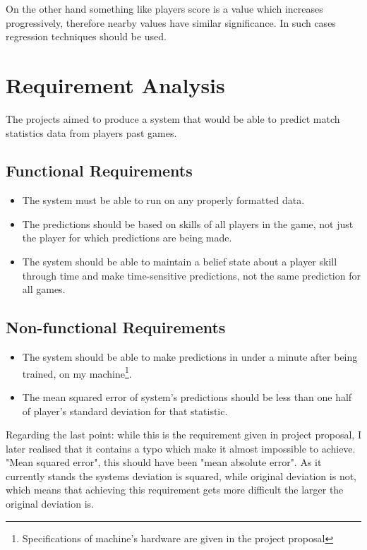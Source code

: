\documentclass[12pt,a4paper]{book}
\begin{document}
On the other hand something like players score is a value which increases progressively, therefore nearby values have similar significance.
In such cases regression techniques should be used.
\section{Requirement Analysis}
The projects aimed to produce a system that would be able to predict match statistics data from players past games.
\subsection{Functional Requirements}
\begin{itemize}
\item The system must be able to run on any properly formatted data.
\item The predictions should be based on skills of all players in the game, not just the player for which predictions are being made.
\item The system should be able to maintain a belief state about a player skill through time and make time-sensitive predictions, not the same prediction for all games. %
\end{itemize}
\subsection{Non-functional Requirements}
\begin{itemize}
\item The system should be able to make predictions in under a minute after being trained, on my machine\footnote{Specifications of machine's hardware are given in the project proposal}.
\item The mean squared error of system's predictions should be less than one half of player's standard deviation for that statistic.
\end{itemize}
Regarding the last point: while this is the requirement given in project proposal, I later realised that it contains a typo which make it almost impossible to achieve.
"Mean squared error", this should have been "mean absolute error".
As it currently stands the systems deviation is squared, while original deviation is not, which means that achieving this requirement gets more difficult the larger the original deviation is.
\end{document}
